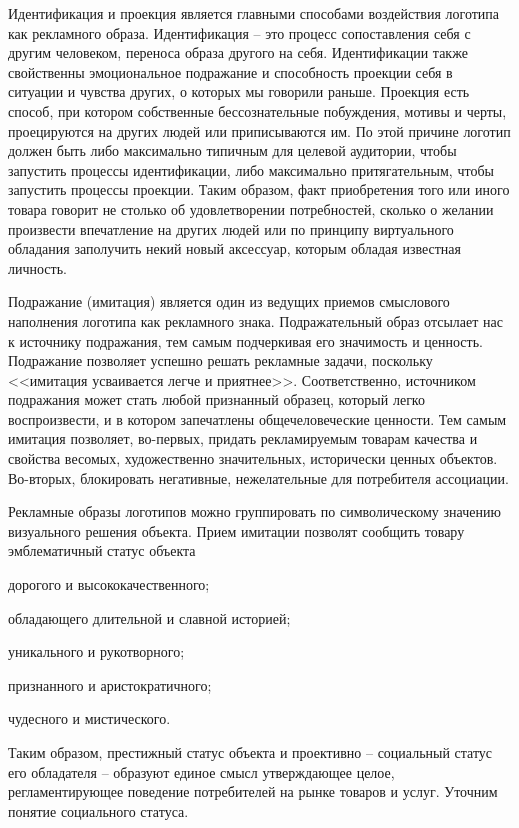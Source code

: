 Идентификация и проекция является главными способами воздействия логотипа как
рекламного образа. Идентификация -- это процесс сопоставления себя с другим
человеком, переноса образа другого на себя. Идентификации также свойственны
эмоциональное подражание и способность проекции себя в ситуации и чувства других,
о которых мы говорили раньше. Проекция есть способ, при котором собственные
бессознательные побуждения,  мотивы  и черты, проецируются на других людей
или приписываются им. По этой причине логотип должен быть либо максимально
типичным для целевой аудитории, чтобы запустить процессы идентификации, либо
максимально притягательным, чтобы запустить процессы проекции. Таким образом,
факт приобретения того или иного товара говорит не столько об удовлетворении
потребностей, сколько о желании произвести впечатление на других людей или по
принципу виртуального обладания заполучить некий новый аксессуар, которым обладая
известная личность.

Подражание (имитация) является один из ведущих приемов смыслового наполнения
логотипа как рекламного знака. Подражательный образ отсылает нас к источнику
подражания, тем самым подчеркивая его значимость и ценность. Подражание позволяет
успешно решать рекламные задачи, поскольку <<имитация усваивается легче и
приятнее>>\autocite[][404]{lotman1998iskusstve}. Соответственно, источником
подражания может стать любой признанный образец, который легко воспроизвести,
и в котором запечатлены общечеловеческие ценности. Тем самым имитация позволяет,
во-первых, придать рекламируемым товарам качества и свойства весомых,
художественно значительных, исторически ценных объектов. Во-вторых, блокировать
негативные, нежелательные для потребителя ассоциации.

Рекламные образы логотипов можно группировать по символическому значению
визуального решения
объекта\autocite[][107]{pavlovskaya2003design}. Прием имитации позволят сообщить
товару эмблематичный статус объекта
\begin{enumerate*}[label=\asbuk*)]
\item дорогого и высококачественного;
\item обладающего длительной и славной историей;
\item уникального и рукотворного;
\item признанного и аристократичного;
\item чудесного и мистического.
\end{enumerate*}
Таким образом, престижный статус объекта и проективно -- социальный статус его
обладателя -- образуют единое смысл утверждающее целое, регламентирующее
поведение потребителей на рынке товаров и услуг. Уточним понятие социального
статуса.

